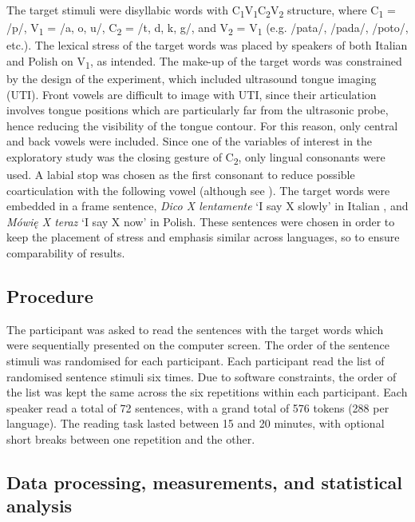 \documentclass[]{JASAnew}
\begin{document}
The target stimuli were disyllabic words with
C\textsubscript{1}V\textsubscript{1}C\textsubscript{2}V\textsubscript{2}
structure, where C\textsubscript{1} = /p/, V\textsubscript{1} = /a, o,
u/, C\textsubscript{2} = /t, d, k, g/, and V\textsubscript{2} =
V\textsubscript{1} (e.g. /pata/, /pada/, /poto/, etc.). The lexical
stress of the target words was placed by speakers of both Italian and
Polish on V\textsubscript{1}, as intended. The make-up of the target
words was constrained by the design of the experiment, which included
ultrasound tongue imaging (UTI). Front vowels are difficult to image
with UTI, since their articulation involves tongue positions which are
particularly far from the ultrasonic probe, hence reducing the
visibility of the tongue contour. For this reason, only central and back
vowels were included. Since one of the variables of interest in the
exploratory study was the closing gesture of C\textsubscript{2}, only
lingual consonants were used. A labial stop was chosen as the first
consonant to reduce possible coarticulation with the following vowel
(although see \citealt{vazquez-alvarez2007}). The target words were
embedded in a frame sentence, \emph{Dico X lentamente} `I say X slowly'
in Italian \citep[following][]{hajek2008}, and \emph{Mówię X teraz} `I
say X now' in Polish. These sentences were chosen in order to keep the
placement of stress and emphasis similar across languages, so to ensure
comparability of results.

\hypertarget{procedure}{%
\subsection{Procedure}\label{procedure}}

The participant was asked to read the sentences with the target words
which were sequentially presented on the computer screen. The order of
the sentence stimuli was randomised for each participant. Each
participant read the list of randomised sentence stimuli six times. Due
to software constraints, the order of the list was kept the same across
the six repetitions within each participant. Each speaker read a total
of 72 sentences, with a grand total of 576 tokens (288 per language).
The reading task lasted between 15 and 20 minutes, with optional short
breaks between one repetition and the other.

\hypertarget{data-processing-measurements-and-statistical-analysis}{%
\subsection{Data processing, measurements, and statistical
analysis}\label{data-processing-measurements-and-statistical-analysis}}
\end{document}
